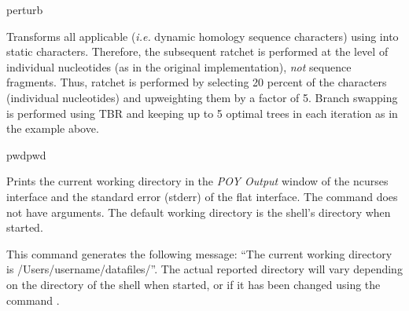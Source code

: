 \begin{command}{perturb}{}
\begin{poyexamples}
            {Transforms all applicable (\emph{i.e.} dynamic homology sequence characters) using
             into static characters. 
            Therefore, the subsequent ratchet is performed at the level of
            individual nucleotides (as in the original implementation), \emph{not}
            sequence fragments. Thus, ratchet is performed by selecting 20 percent of
            the characters (individual nucleotides) and upweighting them by a factor of 5.
            Branch swapping is performed using TBR and keeping up to 5 optimal trees in 
            each iteration as in the example above.}

	\end{poyexamples}
               
	\begin{poyalso}
	\end{poyalso}
	
\end{command}

\begin{command}{pwd}{pwd}

	\syntax{\obligatory{()}}
	
	\begin{poydescription}
         Prints the current working directory in the \emph{POY Output} window of
         the ncurses interface and the standard error (stderr) of the flat interface.
         The command  does not have arguments. The default
         working directory is the shell's directory when \poy started.
	\end{poydescription}
	
	\begin{poyexamples}
		\poyexample{pwd()}
            {This command generates the following message: ``The current
            working directory is /Users/username/datafiles/''. The actual reported
            directory will vary depending on the directory of the shell when
            \poy started, or if it has been changed using the command
            .}
    \end{poyexamples}

    \begin{poyalso}
    \end{poyalso}

\end{command}

